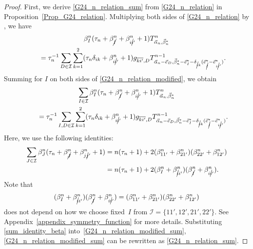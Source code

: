 \documentclass[pdftex]{sigma}
\numberwithin{equation}{section}
\begin{document}
\begin{proof}
First, we derive \eqref{G24_n_relation_sum} from \eqref{G24_n_relation} in Proposition~\ref{Prop_G24_relation}. Multiplying both sides of \eqref{G24_n_relation} by
,
we have
\begin{gather}
 \beta_{I}^{n}
 (
 \tau_{n}
 +
 \beta_{\cancel{I}}^{n}
 +
 \beta_{i\cancel{i}'}^{n}
 +
 1
 )
 T^{n}_{\vec{\alpha}_{n},\vec{\beta}_{n}^{\ast}}
 \nonumber\\
 \qquad=
 \tau_{n}^{-1}
 \sum_{
 D
 \in
 \mathcal{I}
 }
 \sum_{k=1}^{2}
 (
 \tau_{n}
 \delta_{ik}
 +
 \beta_{i\cancel{i}'}^{n}
 +
 1
 )
 g_{\overline{ki'},D}
 T^{n-1}_{
 \vec{\alpha}_{n}
 -
 \vec{e}_{D},
 \vec{\beta}_{n}^{\ast}
 -
 \vec{e}_{I}^{\ast}
 -
 \delta_{\cancel{i}k}
 (
 \vec{e}_{\cancel{I}}^{\ast}
 -
 \vec{e}_{i\cancel{i}'}^{\ast}
 )
 }
 .
 \label{G24_n_relation_modified}
\end{gather}
Summing for $I$ on both sides of \eqref{G24_n_relation_modified}, we obtain
\begin{gather}
 \sum_{
 I
 \in
 \mathcal{I}
 }
 \beta_{I}^{n}
 (
 \tau_{n}
 +
 \beta_{\cancel{I}}^{n}
 +
 \beta_{i\cancel{i}'}^{n}
 +
 1
 )
 T^{n}_{\vec{\alpha}_{n},\vec{\beta}_{n}^{\ast}}\nonumber\\
 \qquad=
 \tau_{n}^{-1}
 \sum_{
 I,
 D
 \in
 \mathcal{I}
 }
 \sum_{k=1}^{2}
 (
 \tau_{n}
 \delta_{ik}
 +
 \beta_{i\cancel{i}'}^{n}
 +
 1
 )
 g_{\overline{ki'},D}
 T^{n-1}_{
 \vec{\alpha}_{n}
 -
 \vec{e}_{D},
 \vec{\beta}_{n}^{\ast}
 -
 \vec{e}_{I}^{\ast}
 -
 \delta_{\cancel{i}k}
 (
 \vec{e}_{\cancel{I}}^{\ast}
 -
 \vec{e}_{i\cancel{i}'}^{\ast} ) } . \label{G24_n_relation_modified_sum}
\end{gather}
Here, we use the following identities:
\begin{align}
 \sum_{
 J
 \in
 \mathcal{I}
 }
 \beta_{J}^{n}
 (
 \tau_{n}
 +
 \beta_{\cancel{J}}^{n}
 +
 \beta_{j\cancel{j}'}^{n}
 +
 1
 )
& =
 n
 (
 \tau_{n}+1
 )
 +
 2
 (
 \beta_{11'}^{n}
 +
 \beta_{21'}^{n}
 )
 (
 \beta_{22'}^{n}
 +
 \beta_{12'}^{n}
 )
 \nonumber
 \\
 &=
 n
 (
 \tau_{n}+1
 )
 +
 2
 (
 \beta_{I}^{n}
 +
 \beta_{\cancel{i}i'}^{n}
 )
 (
 \beta_{\cancel{I}}^{n}
 +
 \beta_{i\cancel{i}'}^{n}
 ).
 \label{sum_identity_beta}
\end{align}
Note that
\[
 (
 \beta_{I}^{n}
 +
 \beta_{\cancel{i}i'}^{n}
 )
 (
 \beta_{\cancel{I}}^{n}
 +
 \beta_{i\cancel{i}'}^{n}
 )
 =
 (
 \beta_{11'}^{n}
 +
 \beta_{21'}^{n}
 )
 (
 \beta_{22'}^{n}
 +
 \beta_{12'}^{n}
 )
\]
does not depend on how we choose fixed~$I$
from
$
\mathcal{I}
=
\{
11',
12',
21',
22'
\}
$.
See Appendix~\ref{appendix_symmetry_function} for more details. Substituting \eqref{sum_identity_beta} into~\eqref{G24_n_relation_modified_sum}, \eqref{G24_n_relation_modified_sum} can be rewritten as \eqref{G24_n_relation_sum}.



\end{proof}
\end{document}
